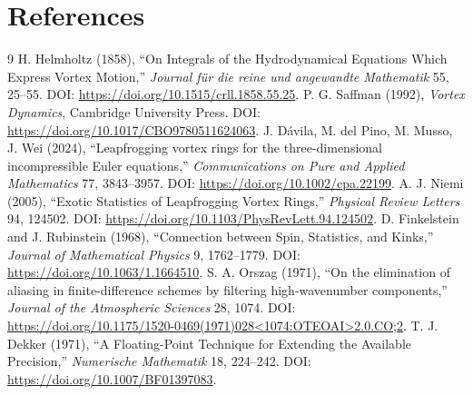 \documentclass[10pt,a4paper]{article}
\begin{document}
\section{References}
\begin{thebibliography}{9}
 H. Helmholtz (1858), ``On Integrals of the Hydrodynamical Equations Which Express Vortex Motion,'' \emph{Journal f\"ur die reine und angewandte Mathematik} 55, 25--55. DOI: \url{https://doi.org/10.1515/crll.1858.55.25}.
 P. G. Saffman (1992), \emph{Vortex Dynamics}, Cambridge University Press. DOI: \url{https://doi.org/10.1017/CBO9780511624063}.
 J. D\'avila, M. del Pino, M. Musso, J. Wei (2024), ``Leapfrogging vortex rings for the three-dimensional incompressible Euler equations,'' \emph{Communications on Pure and Applied Mathematics} 77, 3843--3957. DOI: \url{https://doi.org/10.1002/cpa.22199}.
 A. J. Niemi (2005), ``Exotic Statistics of Leapfrogging Vortex Rings,'' \emph{Physical Review Letters} 94, 124502. DOI: \url{https://doi.org/10.1103/PhysRevLett.94.124502}.
 D. Finkelstein and J. Rubinstein (1968), ``Connection between Spin, Statistics, and Kinks,'' \emph{Journal of Mathematical Physics} 9, 1762--1779. DOI: \url{https://doi.org/10.1063/1.1664510}.
 S. A. Orszag (1971), ``On the elimination of aliasing in finite-difference schemes by filtering high-wavenumber components,'' \emph{Journal of the Atmospheric Sciences} 28, 1074. DOI: \url{https://doi.org/10.1175/1520-0469(1971)028<1074:OTEOAI>2.0.CO;2}.
 T. J. Dekker (1971), ``A Floating-Point Technique for Extending the Available Precision,'' \emph{Numerische Mathematik} 18, 224--242. DOI: \url{https://doi.org/10.1007/BF01397083}.
\end{thebibliography}
\end{document}
